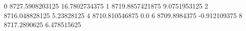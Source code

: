 0 8727.5908203125 16.7802734375
1 8719.8857421875 9.0751953125
2 8716.048828125 5.23828125
4 8710.810546875 0.0
6 8709.8984375 -0.912109375
8 8717.2890625 6.478515625
